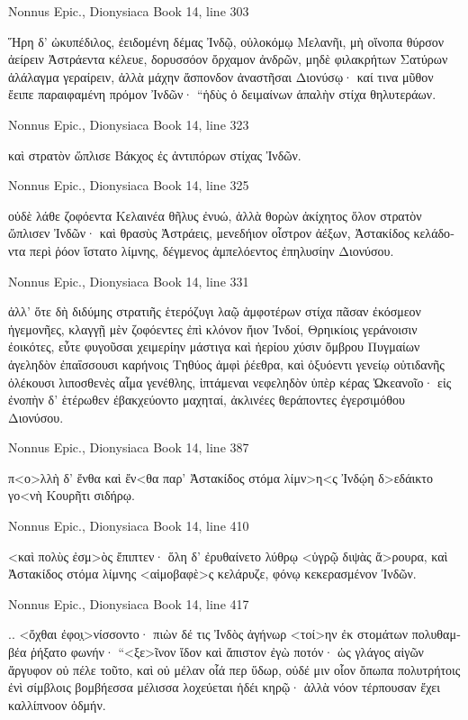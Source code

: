 \documentclass[12pt,letterpaper,twoside,final]{memoir}
\begin{document}
\begin{greek}
Nonnus Epic., Dionysiaca 
Book 14, line 303

Ἥρη δ' ὠκυπέδιλος, ἐειδομένη δέμας Ἰνδῷ, 
οὐλοκόμῳ Μελανῆι, μὴ οἴνοπα θύρσον ἀείρειν 
Ἀστράεντα κέλευε, δορυσσόον ὄρχαμον ἀνδρῶν, 
μηδὲ φιλακρήτων Σατύρων ἀλάλαγμα γεραίρειν, 
ἀλλὰ μάχην ἄσπονδον ἀναστῆσαι Διονύσῳ· 
καί τινα μῦθον ἔειπε παραιφαμένη πρόμον Ἰνδῶν· 
 “ἡδὺς ὁ δειμαίνων ἁπαλὴν στίχα θηλυτεράων. 



Nonnus Epic., Dionysiaca 
Book 14, line 323

καὶ στρατὸν ὥπλισε Βάκχος ἐς ἀντιπόρων στίχας Ἰνδῶν. 



Nonnus Epic., Dionysiaca 
Book 14, line 325

οὐδὲ λάθε ζοφόεντα Κελαινέα θῆλυς ἐνυώ, 
ἀλλὰ θορὼν ἀκίχητος ὅλον στρατὸν ὥπλισεν Ἰνδῶν· 
καὶ θρασὺς Ἀστράεις, μενεδήιον οἶστρον ἀέξων, 
Ἀστακίδος κελάδοντα περὶ ῥόον ἵστατο λίμνης, 
δέγμενος ἀμπελόεντος ἐπηλυσίην Διονύσου. 



Nonnus Epic., Dionysiaca 
Book 14, line 331

ἀλλ' ὅτε δὴ διδύμης στρατιῆς ἑτερόζυγι λαῷ 
ἀμφοτέρων στίχα πᾶσαν ἐκόσμεον ἡγεμονῆες, 
κλαγγῇ μὲν ζοφόεντες ἐπὶ κλόνον ἤιον Ἰνδοί, 
Θρηικίοις γεράνοισιν ἐοικότες, εὖτε φυγοῦσαι 
χειμερίην μάστιγα καὶ ἠερίου χύσιν ὄμβρου 
Πυγμαίων ἀγεληδὸν ἐπαΐσσουσι καρήνοις 
Τηθύος ἀμφὶ ῥέεθρα, καὶ ὀξυόεντι γενείῳ 
οὐτιδανῆς ὀλέκουσι λιποσθενὲς αἷμα γενέθλης,   
ἱπτάμεναι νεφεληδὸν ὑπὲρ κέρας Ὠκεανοῖο· 
εἰς ἐνοπὴν δ' ἑτέρωθεν ἐβακχεύοντο μαχηταί, 
ἀκλινέες θεράποντες ἐγερσιμόθου Διονύσου. 



Nonnus Epic., Dionysiaca 
Book 14, line 387

π<ο>λλὴ δ' ἔνθα καὶ ἔν<θα παρ' Ἀστακίδος στόμα λίμν>η<ς 
Ἰνδῴη δ>εδάικτο γο<νὴ Κουρῆτι σιδήρῳ. 



Nonnus Epic., Dionysiaca 
Book 14, line 410

<καὶ πολὺς ἐσμ>ὸς ἔπιπτεν· ὅλη δ' ἐρυθαίνετο λύθρῳ 
<ὑγρῷ διψὰς ἄ>ρουρα, καὶ Ἀστακίδος στόμα λίμνης   
<αἱμοβαφὲ>ς κελάρυζε, φόνῳ κεκερασμένον Ἰνδῶν. 



Nonnus Epic., Dionysiaca 
Book 14, line 417

                                                     .. 
<ὄχθαι ἐφο̣ι̣>νίσσοντο· πιὼν δέ τις Ἰνδὸς ἀγήνωρ 
<τοί>ην ἐκ στομάτων πολυθαμβέα ῥήξατο φωνήν· 
 “<ξε>ῖνον ἴδον καὶ ἄπιστον ἐγὼ ποτόν· ὡς γλάγος αἰγῶν 
ἄργυφον οὐ πέλε τοῦτο, καὶ οὐ μέλαν οἷά περ ὕδωρ, 
οὐδέ μιν οἷον ὄπωπα πολυτρήτοις ἐνὶ σίμβλοις 
βομβήεσσα μέλισσα λοχεύεται ἡδέι κηρῷ· 
ἀλλὰ νόον τέρπουσαν ἔχει καλλίπνοον ὀδμήν. 




\end{greek}
\end{document}
